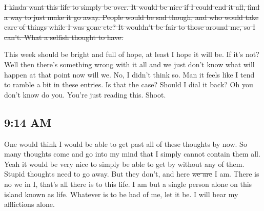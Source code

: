 \st{I kinda want this life to simply be over. It would be nice if I could end it all,
find a way to just make it go away. People would be sad though, and who would take
care of things while I was gone etc? It wouldn't be fair to those around me, so I 
can't. What a selfish thought to have.}

This week should be bright and full of hope, at least I hope it will be. If it's not?
Well then there's something wrong with it all and we just don't know what will happen
at that point now will we. No, I didn't think so. Man it feels like I tend to ramble
a bit in these entries. Is that the case? Should I dial it back? Oh you don't know do
you. You're just reading this. Shoot.

\subsection{9:14 AM}

One would think I would be able to get past all of these thoughts by now. So many
thoughts come and go into my mind that I simply cannot contain them all. Yeah it
would be very nice to simply be able to get by without any of them. Stupid thoughts
need to go away. But they don't, and here \st{we are} I am. There is no we in I,
that's all there is to this life. I am but a single person alone on this island known
as life. Whatever is to be had of me, let it be. I will bear my afflictions alone.